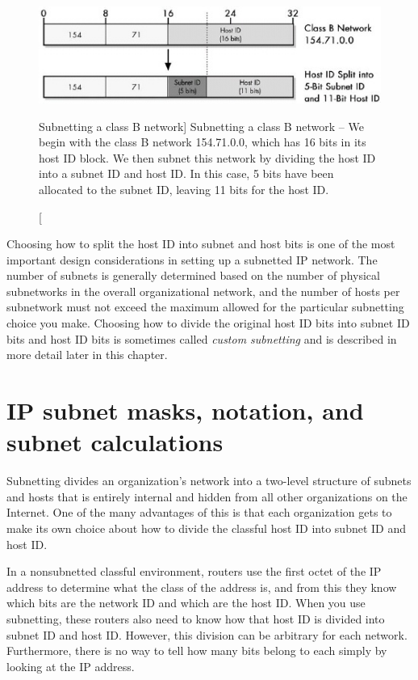 \begin{figure}
   \centering
   \includegraphics[width=.7\textwidth]{images/subnetting-class-b-example.jpg}
   \caption
      [Subnetting a class B network]
      {Subnetting a class B network -- We begin with the class B network 154.71.0.0, which has 16 bits in its host ID block.
      We then subnet this network by dividing the host ID into a subnet ID and host ID.
      In this case, 5 bits have been allocated to the subnet ID, leaving 11 bits for the host ID.}
   \label{fig:subnetting-class-b-example}
\end{figure}


Choosing how to split the host ID into subnet and host bits is one of
the most important design considerations in setting up a subnetted IP
network. The number of subnets is generally determined based on the
number of physical subnetworks in the overall organizational network,
and the number of hosts per subnetwork must not exceed the maximum
allowed for the particular subnetting choice you make. Choosing how to
divide the original host ID bits into subnet ID bits and host ID bits is
sometimes called {\emph{custom subnetting}} and is described in more
detail later in this chapter.



\section{IP subnet masks, notation, and subnet calculations}

Subnetting divides an organization's network into a two-level structure of subnets
and hosts that is entirely internal and hidden from all other
organizations on the Internet. One of the many advantages of this is
that each organization gets to make its own choice about how to divide
the classful host ID into subnet ID and host ID.

In a nonsubnetted classful environment, routers use the first octet of
the IP address to determine what the class of the address is, and from
this they know which bits are the network ID and which are the host ID.
When you use subnetting, these routers also need to know how that host
ID is divided into subnet ID and host ID. However, this division can be
arbitrary for each network. Furthermore, there is no way to tell how
many bits belong to each simply by looking at the IP address.

